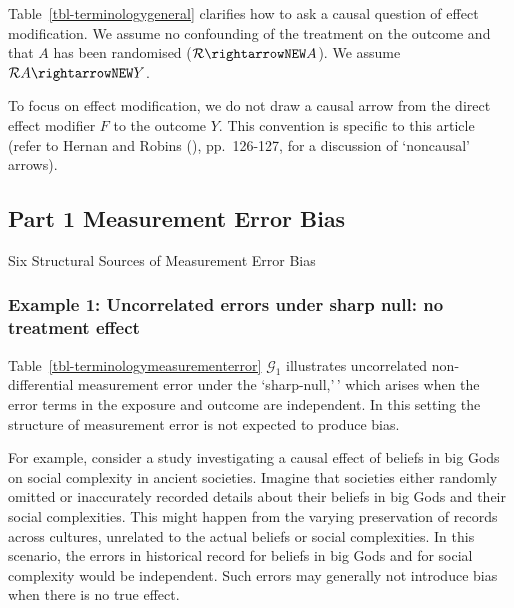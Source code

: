 \documentclass[
  single column]{article}
\begin{document}
Table~\ref{tbl-terminologygeneral} clarifies how to ask a causal
question of effect modification. We assume no confounding of the
treatment on the outcome and that \(A\) has been randomised
(\(\mathcal{R} \rightarrowNEW A\)). We assume
\(\mathcal{R}  A \rightarrowNEW Y\).

To focus on effect modification, we do not draw a causal arrow from the
direct effect modifier \(F\) to the outcome \(Y\). This convention is
specific to this article (refer to Hernan and Robins
(), pp.~126-127, for a discussion
of `noncausal' arrows).

\subsection{Part 1 Measurement Error
Bias}\label{part-1-measurement-error-bias}

\begin{table}

\caption{\label{tbl-terminologymeasurementerror}Six Structural Sources
of Measurement Error Bias}

\centering{

\terminologymeasurementerror

}

\end{table}%

\subsubsection{Example 1: Uncorrelated errors under sharp null: no
treatment
effect}\label{example-1-uncorrelated-errors-under-sharp-null-no-treatment-effect}

Table~\ref{tbl-terminologymeasurementerror} \(\mathcal{G}_1\)
illustrates uncorrelated non-differential measurement error under the
`sharp-null,'\,' which arises when the error terms in the exposure and
outcome are independent. In this setting the structure of measurement
error is not expected to produce bias.

For example, consider a study investigating a causal effect of beliefs
in big Gods on social complexity in ancient societies. Imagine that
societies either randomly omitted or inaccurately recorded details about
their beliefs in big Gods and their social complexities. This might
happen from the varying preservation of records across cultures,
unrelated to the actual beliefs or social complexities. In this
scenario, the errors in historical record for beliefs in big Gods and
for social complexity would be independent. Such errors may generally
not introduce bias when there is no true effect.
\end{document}
